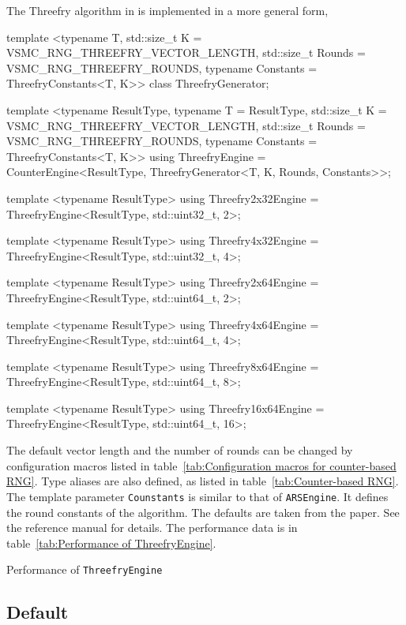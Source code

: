 The Threefry algorithm in \textcite{Salmon:2011um} is implemented in a more
general form,
\begin{cppcode}
  template <typename T, std::size_t K = VSMC_RNG_THREEFRY_VECTOR_LENGTH,
      std::size_t Rounds = VSMC_RNG_THREEFRY_ROUNDS,
      typename Constants = ThreefryConstants<T, K>>
  class ThreefryGenerator;

  template <typename ResultType, typename T = ResultType,
      std::size_t K = VSMC_RNG_THREEFRY_VECTOR_LENGTH,
      std::size_t Rounds = VSMC_RNG_THREEFRY_ROUNDS,
      typename Constants = ThreefryConstants<T, K>>
  using ThreefryEngine =
      CounterEngine<ResultType, ThreefryGenerator<T, K, Rounds, Constants>>;

  template <typename ResultType>
  using Threefry2x32Engine = ThreefryEngine<ResultType, std::uint32_t, 2>;

  template <typename ResultType>
  using Threefry4x32Engine = ThreefryEngine<ResultType, std::uint32_t, 4>;

  template <typename ResultType>
  using Threefry2x64Engine = ThreefryEngine<ResultType, std::uint64_t, 2>;

  template <typename ResultType>
  using Threefry4x64Engine = ThreefryEngine<ResultType, std::uint64_t, 4>;

  template <typename ResultType>
  using Threefry8x64Engine = ThreefryEngine<ResultType, std::uint64_t, 8>;

  template <typename ResultType>
  using Threefry16x64Engine = ThreefryEngine<ResultType, std::uint64_t, 16>;
\end{cppcode}
The default vector length and the number of rounds can be changed by
configuration macros listed in table~\ref{tab:Configuration macros for
  counter-based RNG}. Type aliases are also defined, as listed in
table~\ref{tab:Counter-based RNG}. The template parameter \verb|Counstants| is
similar to that of \verb|ARSEngine|. It defines the round constants of the
algorithm. The defaults are taken from the paper. See the reference manual for
details. The performance data is in table~\ref{tab:Performance of
  ThreefryEngine}.

\begin{table}
  
  \caption{Performance of \texttt{ThreefryEngine}}
  \label{tab:Performance of ThreefryEngine}
\end{table}

\subsection{Default \protect\rng}
\label{sub:Default RNG}

